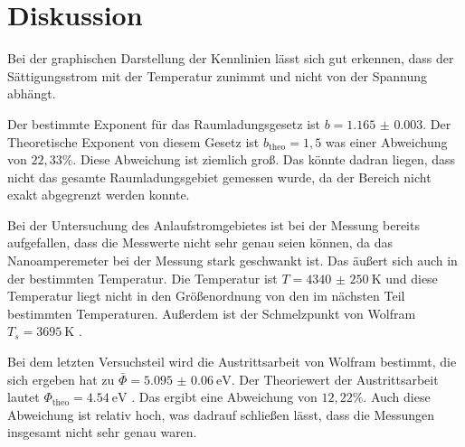 \section{Diskussion}

Bei der graphischen Darstellung der Kennlinien lässt sich gut erkennen, dass
der Sättigungsstrom mit der Temperatur zunimmt und nicht von der Spannung abhängt.

Der bestimmte Exponent für das Raumladungsgesetz ist $b = \num{1.165(3)}$. Der
Theoretische Exponent von diesem Gesetz ist $b_\text{theo} = 1,5$ was einer Abweichung
von $22,33 \%$. Diese Abweichung ist ziemlich groß. Das könnte dadran liegen, dass
nicht das gesamte Raumladungsgebiet gemessen wurde, da der Bereich nicht exakt abgegrenzt
werden konnte.

Bei der Untersuchung des Anlaufstromgebietes ist bei der Messung bereits aufgefallen,
dass die Messwerte nicht sehr genau seien können, da das Nanoamperemeter bei der
Messung stark geschwankt ist. Das äußert sich auch in der bestimmten Temperatur.
Die Temperatur ist $T = \SI{4340(250)}{\kelvin}$ und diese Temperatur liegt nicht in
den Größenordnung von den im nächsten Teil bestimmten Temperaturen. Außerdem ist der
Schmelzpunkt von Wolfram $ T_s = \SI{3695}{\kelvin}$ \cite{2}.

Bei dem letzten Versuchsteil wird die Austrittsarbeit von Wolfram bestimmt, die
sich ergeben hat zu $ \bar{\Phi} = \SI{5.095(60)}{\eV}$. Der Theoriewert der Austrittsarbeit
lautet $ \Phi_\text{theo} = \SI{4.54}{\eV}$ \cite{3}. Das ergibt eine Abweichung von $12,22 \%$.
Auch diese Abweichung ist relativ hoch, was dadrauf schließen lässt, dass die Messungen
insgesamt nicht sehr genau waren.
